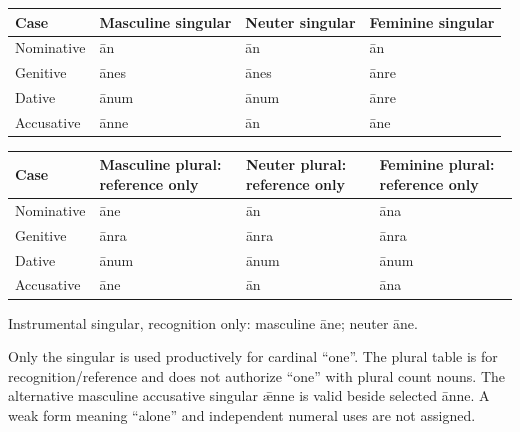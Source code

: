 \par\begingroup
\fontsize{10.5}{13.2}\selectfont
\setlength{\LTleft}{0pt}\setlength{\LTright}{\fill}
\noindent
\begin{tabular}{@{}>{\raggedright\arraybackslash}p{22.0mm}>{\raggedright\arraybackslash}p{31.188mm}>{\raggedright\arraybackslash}p{31.188mm}>{\raggedright\arraybackslash}p{31.188mm}@{}}
\toprule
\textbf{Case} & \textbf{Masculine singular} & \textbf{Neuter singular} & \textbf{Feminine singular} \\
\midrule
Nominative & ān & ān & ān \\
Genitive & ānes & ānes & ānre \\
Dative & ānum & ānum & ānre \\
Accusative & ānne & ān & āne \\
\bottomrule
\end{tabular}
\par\endgroup
\par\addvspace{5pt}
\par\begingroup
\fontsize{10.5}{13.2}\selectfont
\setlength{\LTleft}{0pt}\setlength{\LTright}{\fill}
\noindent
\begin{tabular}{@{}>{\raggedright\arraybackslash}p{22.0mm}>{\raggedright\arraybackslash}p{31.188mm}>{\raggedright\arraybackslash}p{31.188mm}>{\raggedright\arraybackslash}p{31.188mm}@{}}
\toprule
\textbf{Case} & \textbf{Masculine plural: reference only} & \textbf{Neuter plural: reference only} & \textbf{Feminine plural: reference only} \\
\midrule
Nominative & āne & ān & āna \\
Genitive & ānra & ānra & ānra \\
Dative & ānum & ānum & ānum \\
Accusative & āne & ān & āna \\
\bottomrule
\end{tabular}
\par\endgroup
Instrumental singular, recognition only: masculine āne; neuter āne.

Only the singular is used productively for cardinal “one”. The plural table is for recognition/\allowbreak{}reference and does not authorize “one” with plural count nouns. The alternative masculine accusative singular ǣnne is valid beside selected ānne. A weak form meaning “alone” and independent numeral uses are not assigned.

